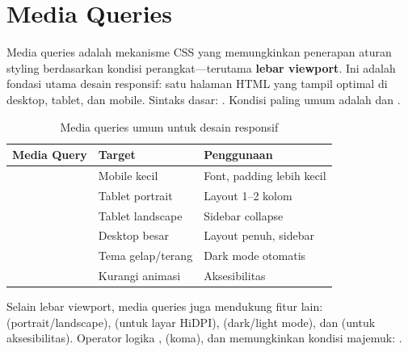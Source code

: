 \section{Media Queries}

Media queries adalah mekanisme CSS yang memungkinkan penerapan aturan styling berdasarkan kondisi perangkat---terutama \textbf{lebar viewport}. Ini adalah fondasi utama desain responsif: satu halaman HTML yang tampil optimal di desktop, tablet, dan mobile. Sintaks dasar: . Kondisi paling umum adalah  dan  \cite{mdnCss}.

\begin{table}[htbp]
\centering
\begin{tabular}{|P{4.5cm}|P{3cm}|P{4.5cm}|}
\hline
\textbf{Media Query} & \textbf{Target} & \textbf{Penggunaan} \\
\hline
{} & Mobile kecil & Font, padding lebih kecil \\
\hline
{} & Tablet portrait & Layout 1--2 kolom \\
\hline
{} & Tablet landscape & Sidebar collapse \\
\hline
{} & Desktop besar & Layout penuh, sidebar \\
\hline
{} & Tema gelap/terang & Dark mode otomatis \\
\hline
{} & Kurangi animasi & Aksesibilitas \\
\hline
\end{tabular}
\caption{Media queries umum untuk desain responsif}
\end{table}

Selain lebar viewport, media queries juga mendukung fitur lain:  (portrait/landscape),  (untuk layar HiDPI),  (dark/light mode), dan  (untuk aksesibilitas). Operator logika ,  (koma), dan  memungkinkan kondisi majemuk:  \cite{webdevCss}.



